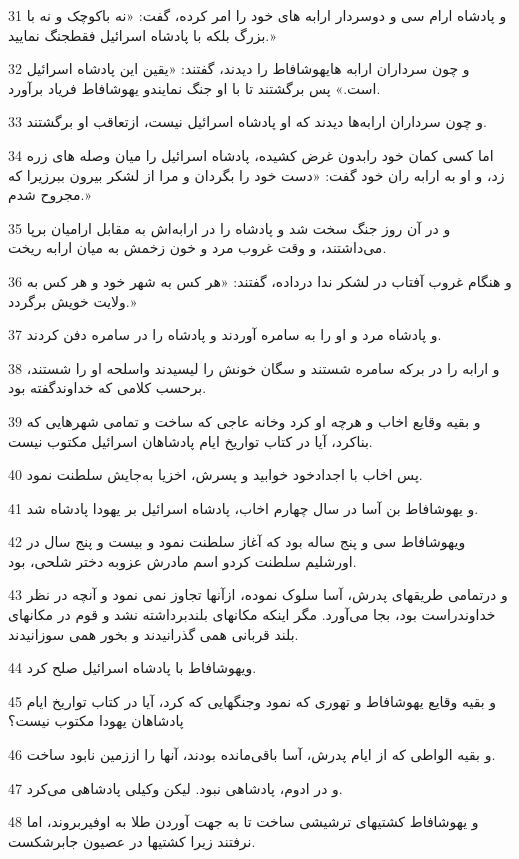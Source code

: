\par 31 و پادشاه ارام سی و دوسردار ارابه های خود را امر کرده، گفت: «نه باکوچک و نه با بزرگ بلکه با پادشاه اسرائیل فقطجنگ نمایید.»
\par 32 و چون سرداران ارابه هایهوشافاط را دیدند، گفتند: «یقین این پادشاه اسرائیل است.» پس برگشتند تا با او جنگ نمایندو یهوشافاط فریاد برآورد.
\par 33 و چون سرداران ارابه‌ها دیدند که او پادشاه اسرائیل نیست، ازتعاقب او برگشتند.
\par 34 اما کسی کمان خود رابدون غرض کشیده، پادشاه اسرائیل را میان وصله های زره زد، و او به ارابه ران خود گفت: «دست خود را بگردان و مرا از لشکر بیرون ببرزیرا که مجروح شدم.»
\par 35 و در آن روز جنگ سخت شد و پادشاه را در ارابه‌اش به مقابل ارامیان برپا می‌داشتند، و وقت غروب مرد و خون زخمش به میان ارابه ریخت.
\par 36 و هنگام غروب آفتاب در لشکر ندا در‌داده، گفتند: «هر کس به شهر خود و هر کس به ولایت خویش برگردد.»
\par 37 و پادشاه مرد و او را به سامره آوردند و پادشاه را در سامره دفن کردند.
\par 38 و ارابه را در برکه سامره شستند و سگان خونش را لیسیدند واسلحه او را شستند، برحسب کلامی که خداوندگفته بود.
\par 39 و بقیه وقایع اخاب و هر‌چه او کرد وخانه عاجی که ساخت و تمامی شهرهایی که بناکرد، آیا در کتاب تواریخ ایام پادشاهان اسرائیل مکتوب نیست.
\par 40 پس اخاب با اجدادخود خوابید و پسرش، اخزیا به‌جایش سلطنت نمود.
\par 41 و یهوشافاط بن آسا در سال چهارم اخاب، پادشاه اسرائیل بر یهودا پادشاه شد.
\par 42 ویهوشافاط سی و پنج ساله بود که آغاز سلطنت نمود و بیست و پنج سال در اورشلیم سلطنت کردو اسم مادرش عزوبه دختر شلحی، بود.
\par 43 و درتمامی طریقهای پدرش، آسا سلوک نموده، ازآنها تجاوز نمی نمود و آنچه در نظر خداوندراست بود، بجا می‌آورد. مگر اینکه مکانهای بلندبرداشته نشد و قوم در مکانهای بلند قربانی همی گذرانیدند و بخور همی سوزانیدند.
\par 44 ویهوشافاط با پادشاه اسرائیل صلح کرد.
\par 45 و بقیه وقایع یهوشافاط و تهوری که نمود وجنگهایی که کرد، آیا در کتاب تواریخ ایام پادشاهان یهودا مکتوب نیست؟
\par 46 و بقیه الواطی که از ایام پدرش، آسا باقی‌مانده بودند، آنها را اززمین نابود ساخت.
\par 47 و در ادوم، پادشاهی نبود. لیکن وکیلی پادشاهی می‌کرد.
\par 48 و یهوشافاط کشتیهای ترشیشی ساخت تا به جهت آوردن طلا به اوفیربروند، اما نرفتند زیرا کشتیها در عصیون جابرشکست.

